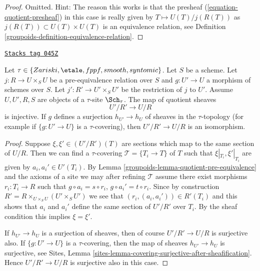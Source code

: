 \begin{proof}

Omitted. Hint: The reason this works is that the presheaf
(\ref{equation-quotient-presheaf}) in this case is really given
by $T \mapsto U(T)/j(R(T))$ as $j(R(T)) \subset U(T) \times U(T)$
is an equivalence relation, see
Definition \ref{groupoids-definition-equivalence-relation}.
\end{proof}

\begin{lemma}
\label{groupoids-lemma-quotient-pre-equivalence-relation-restrict}
\href{https://stacks.math.columbia.edu/tag/045Z}{\texttt{Stacks tag 045Z}}

Let $\tau \in \{Zariski, \etale, fppf, smooth, syntomic\}$.
Let $S$ be a scheme.
Let $j : R \to U \times_S U$ be a pre-equivalence relation over $S$
and $g : U' \to U$ a morphism of schemes over $S$.
Let $j' : R' \to U' \times_S U'$ be the restriction of $j$ to $U'$.
Assume  $U, U', R, S$ are objects of a $\tau$-site $\Sch_\tau$.
The map of quotient sheaves
$$
U'/R' \longrightarrow U/R
$$
is injective. If $g$ defines a surjection $h_{U'} \to h_U$ of sheaves
in the $\tau$-topology (for example if $\{g : U' \to U\}$ is a
$\tau$-covering), then $U'/R' \to U/R$ is an isomorphism.
\end{lemma}

\begin{proof}

Suppose $\xi, \xi' \in (U'/R')(T)$ are sections which
map to the same section of $U/R$.
Then we can find a $\tau$-covering $\mathcal{T} = \{T_i \to T\}$ of $T$
such that $\xi|_{T_i}, \xi'|_{T_i}$ are given by $a_i, a_i' \in U'(T_i)$. By
Lemma \ref{groupoids-lemma-quotient-pre-equivalence}
and the axioms of a site we may after refining
$\mathcal{T}$ assume there exist morphisms $r_i : T_i \to R$
such that $g \circ a_i = s \circ r_i$, $g \circ a_i' = t \circ r_i$.
Since by construction
$R' = R \times_{U \times_S U} (U' \times_S U')$
we see that $(r_i, (a_i, a_i')) \in R'(T_i)$ and this
shows that $a_i$ and $a_i'$ define the same section
of $U'/R'$ over $T_i$. By the sheaf condition this implies
$\xi = \xi'$.

\medskip\noindent
If $h_{U'} \to h_U$ is a surjection
of sheaves, then of course $U'/R' \to U/R$ is surjective also.
If $\{g : U' \to U\}$ is a $\tau$-covering, then
the map of sheaves $h_{U'} \to h_U$ is surjective, see
Sites, Lemma \ref{sites-lemma-covering-surjective-after-sheafification}.
Hence $U'/R' \to U/R$ is surjective also in this case.
\end{proof}

